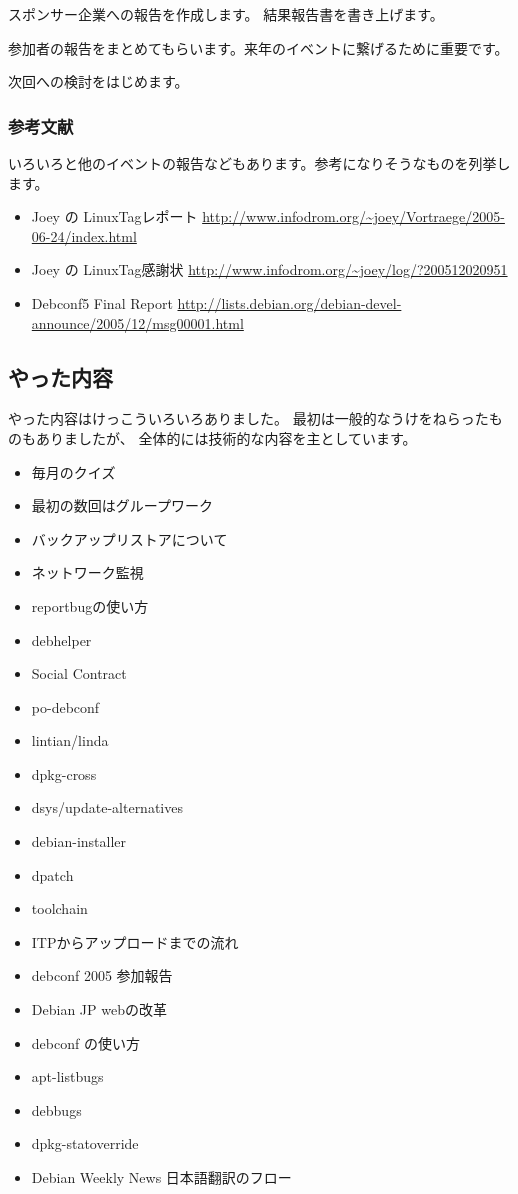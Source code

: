 \documentclass[mingoth,a4paper]{jsarticle}
\begin{document}
スポンサー企業への報告を作成します。
結果報告書を書き上げます。

参加者の報告をまとめてもらいます。来年のイベントに繋げるために重要です。

次回への検討をはじめます。

\subsubsection{参考文献}

いろいろと他のイベントの報告などもあります。参考になりそうなものを列挙し
ます。

\begin{itemize}
 \item
      Joey の LinuxTagレポート
      \url{http://www.infodrom.org/~joey/Vortraege/2005-06-24/index.html}
 \item
      Joey の LinuxTag感謝状
      \url{http://www.infodrom.org/~joey/log/?200512020951}
 \item
      Debconf5 Final Report
      \url{http://lists.debian.org/debian-devel-announce/2005/12/msg00001.html}
      
\end{itemize}

\subsection{やった内容}

やった内容はけっこういろいろありました。
最初は一般的なうけをねらったものもありましたが、
全体的には技術的な内容を主としています。

\begin{itemize}
 \item 毎月のクイズ
 \item 最初の数回はグループワーク
 \item バックアップリストアについて
 \item ネットワーク監視
 \item reportbugの使い方
 \item debhelper
 \item Social Contract
 \item po-debconf
 \item lintian/linda
 \item dpkg-cross
 \item dsys/update-alternatives
 \item debian-installer
 \item dpatch
 \item toolchain
 \item ITPからアップロードまでの流れ
 \item debconf 2005 参加報告
 \item Debian JP webの改革
 \item debconf の使い方
 \item apt-listbugs
 \item debbugs
 \item dpkg-statoverride
 \item Debian Weekly News 日本語翻訳のフロー
\end{itemize}
\end{document}
